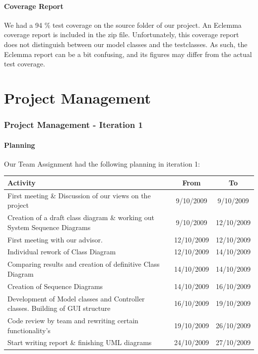 		\subsection{Coverage Report}
		We had a 94 \% test coverage on the source folder of our project. An Eclemma coverage report is included in the zip file. Unfortunately, this coverage report does not distinguish between our model classes and the testclasses. As such, the Eclemma report can be a bit confusing, and its figures may differ from the actual test coverage.
	
	\part{Project Management}
	
	\section{Project Management - Iteration 1}
		\subsection{Planning}
		Our Team Assignment had the following planning in iteration 1:\\
		\begin{tabular}{p{200 pt}|c|c}
		Activity & From & To\\
		\hline
		First meeting \& Discussion of our views on the project & 9/10/2009 & 9/10/2009\\ \hline
		Creation of a draft class diagram \& working out System Sequence Diagrams & 9/10/2009 & 12/10/2009\\ \hline
		First meeting with our advisor. & 12/10/2009 & 12/10/2009\\ \hline
		Individual rework of Class Diagram & 12/10/2009 & 14/10/2009\\ \hline
		Comparing results and creation of definitive Class Diagram & 14/10/2009 & 14/10/2009\\ \hline
		Creation of Sequence Diagrams & 14/10/2009 & 16/10/2009\\ \hline
		Development of Model classes and Controller classes. Building of GUI structure & 16/10/2009 & 19/10/2009\\ \hline
		Code review by team and rewriting certain functionality's & 19/10/2009 & 26/10/2009\\ \hline
		Start writing report \& finishing UML diagrams & 24/10/2009 & 27/10/2009\\ \hline
		\end{tabular}
